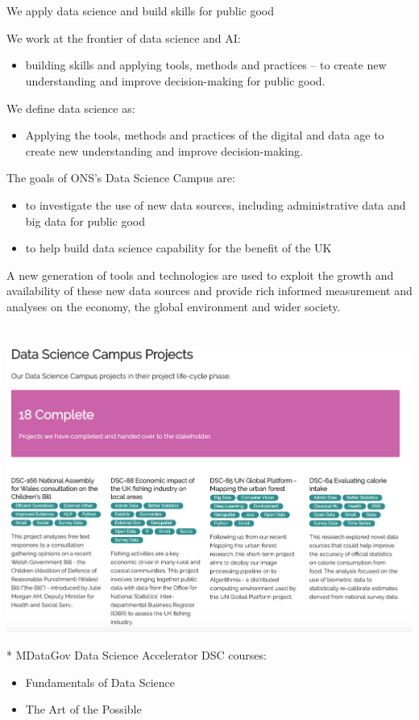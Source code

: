 \documentclass[11pt]{article}
\begin{document}
\section*{}
\label{sec:org4f73c2a}
We apply data science
and build skills
for public good
\begin{NOTES}
We work at the frontier of data science and AI:
\begin{itemize}
\item building skills and applying tools, methods and practices – to create new understanding and improve decision-making for public good.
\end{itemize}

We define data science as:
\begin{itemize}
\item Applying the tools, methods and practices of the digital and data age to create new understanding and improve decision-making.
\end{itemize}

The goals of ONS’s Data Science Campus are:
\begin{itemize}
\item to investigate the use of new data sources, including administrative data and
big data for public good
\item to help build data science capability for the benefit of the UK
\end{itemize}
A new generation of tools and technologies are used to exploit the growth and
availability of these new data sources and provide rich informed measurement and analyses on the economy, the global environment and wider society.
\end{NOTES}
\section*{}
\label{sec:org9ae9f63}
\section*{}
\label{sec:orgd0981c3}
\begin{center}
\includegraphics[width=.9\linewidth]{./img/dsc-projects.png}
\end{center}
*
MDataGov
Data Science Accelerator
DSC courses:
\begin{itemize}
\item Fundamentals of Data Science
\end{itemize}
\begin{itemize}
\item The Art of the Possible
\end{itemize}
\end{document}
